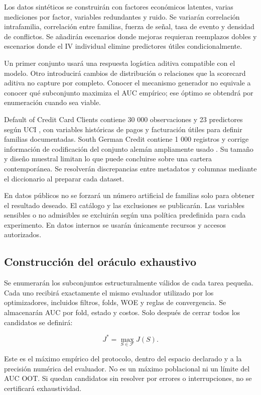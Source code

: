 \documentclass[11pt,letterpaper]{article}
\begin{document}
Los datos sintéticos se construirán con factores económicos latentes, varias mediciones por factor, variables redundantes y ruido. Se variarán correlación intrafamilia, correlación entre familias, fuerza de señal, tasa de evento y densidad de conflictos. Se añadirán escenarios donde mejoras requieran reemplazos dobles y escenarios donde el IV individual elimine predictores útiles condicionalmente.

Un primer conjunto usará una respuesta logística aditiva compatible con el modelo. Otro introducirá cambios de distribución o relaciones que la scorecard aditiva no capture por completo. Conocer el mecanismo generador no equivale a conocer qué subconjunto maximiza el AUC empírico; ese óptimo se obtendrá por enumeración cuando sea viable.

Default of Credit Card Clients contiene 30 000 observaciones y 23 predictores según UCI \cite{ref12}, con variables históricas de pagos y facturación útiles para definir familias documentadas. South German Credit contiene 1 000 registros y corrige información de codificación del conjunto alemán ampliamente usado \cite{ref13}. Su tamaño y diseño muestral limitan lo que puede concluirse sobre una cartera contemporánea. Se resolverán discrepancias entre metadatos y columnas mediante el diccionario al preparar cada dataset.

En datos públicos no se forzará un número artificial de familias solo para obtener el resultado deseado. El catálogo y las exclusiones se publicarán. Las variables sensibles o no admisibles se excluirán según una política predefinida para cada experimento. En datos internos se usarán únicamente recursos y accesos autorizados.

\subsection{Construcción del oráculo exhaustivo}\label{sec:10.3}

Se enumerarán los subconjuntos estructuralmente válidos de cada tarea pequeña. Cada uno recibirá exactamente el mismo evaluador utilizado por los optimizadores, incluidos filtros, folds, WOE y reglas de convergencia. Se almacenarán AUC por fold, estado y costos. Solo después de cerrar todos los candidatos se definirá:

\[
J^*=\max_{S\in\mathcal{F}}J(S).
\]

Este es el máximo empírico del protocolo, dentro del espacio declarado y a la precisión numérica del evaluador. No es un máximo poblacional ni un límite del AUC OOT. Si quedan candidatos sin resolver por errores o interrupciones, no se certificará exhaustividad.
\end{document}
